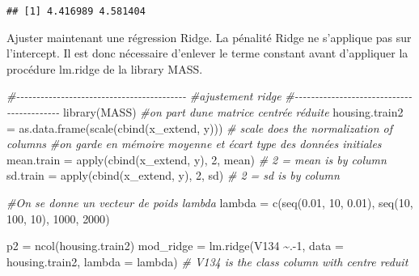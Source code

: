 \documentclass[
]{article}
\newenvironment{Shaded}{\begin{snugshade}}{\end{snugshade}}
\newcommand{\AttributeTok}[1]{\textcolor[rgb]{0.77,0.63,0.00}{#1}}
\newcommand{\CommentTok}[1]{\textcolor[rgb]{0.56,0.35,0.01}{\textit{#1}}}
\newcommand{\DecValTok}[1]{\textcolor[rgb]{0.00,0.00,0.81}{#1}}
\newcommand{\FloatTok}[1]{\textcolor[rgb]{0.00,0.00,0.81}{#1}}
\newcommand{\FunctionTok}[1]{\textcolor[rgb]{0.00,0.00,0.00}{#1}}
\newcommand{\NormalTok}[1]{#1}
\newcommand{\OtherTok}[1]{\textcolor[rgb]{0.56,0.35,0.01}{#1}}
\newcommand{\SpecialCharTok}[1]{\textcolor[rgb]{0.00,0.00,0.00}{#1}}
\begin{document}
\begin{verbatim}
## [1] 4.416989 4.581404
\end{verbatim}

Ajuster maintenant une régression Ridge. La pénalité Ridge ne s'applique
pas sur l'intercept. Il est donc nécessaire d'enlever le terme constant
avant d'appliquer la procédure lm.ridge de la library MASS.

\begin{Shaded}
\begin{Highlighting}[]
\CommentTok{\#{-}{-}{-}{-}{-}{-}{-}{-}{-}{-}{-}{-}{-}{-}{-}{-}{-}{-}{-}{-}{-}{-}{-}{-}{-}{-}{-}{-}{-}{-}{-}{-}{-}{-}{-}{-}{-}{-}{-}{-}{-}{-}}
\CommentTok{\#ajustement ridge }
\CommentTok{\#{-}{-}{-}{-}{-}{-}{-}{-}{-}{-}{-}{-}{-}{-}{-}{-}{-}{-}{-}{-}{-}{-}{-}{-}{-}{-}{-}{-}{-}{-}{-}{-}{-}{-}{-}{-}{-}{-}{-}{-}{-}{-}}
\FunctionTok{library}\NormalTok{(MASS)}
\CommentTok{\#on part d\textquotesingle{}une matrice centrée réduite}
\NormalTok{housing.train2 }\OtherTok{=} \FunctionTok{as.data.frame}\NormalTok{(}\FunctionTok{scale}\NormalTok{(}\FunctionTok{cbind}\NormalTok{(x\_extend, y))) }\CommentTok{\# scale does the normalization of columns}
\CommentTok{\#on garde en mémoire moyenne et écart type des données initiales}
\NormalTok{mean.train }\OtherTok{=} \FunctionTok{apply}\NormalTok{(}\FunctionTok{cbind}\NormalTok{(x\_extend, y), }\DecValTok{2}\NormalTok{, mean)  }\CommentTok{\# 2 = mean is by column}
\NormalTok{sd.train }\OtherTok{=} \FunctionTok{apply}\NormalTok{(}\FunctionTok{cbind}\NormalTok{(x\_extend, y), }\DecValTok{2}\NormalTok{, sd)  }\CommentTok{\# 2 = sd is by column}

\CommentTok{\#On se donne un vecteur de poids lambda}
\NormalTok{lambda }\OtherTok{=} \FunctionTok{c}\NormalTok{(}\FunctionTok{seq}\NormalTok{(}\FloatTok{0.01}\NormalTok{, }\DecValTok{10}\NormalTok{, }\FloatTok{0.01}\NormalTok{), }\FunctionTok{seq}\NormalTok{(}\DecValTok{10}\NormalTok{, }\DecValTok{100}\NormalTok{, }\DecValTok{10}\NormalTok{), }\DecValTok{1000}\NormalTok{, }\DecValTok{2000}\NormalTok{)}

\NormalTok{p2 }\OtherTok{=} \FunctionTok{ncol}\NormalTok{(housing.train2)}
\NormalTok{mod\_ridge }\OtherTok{=} \FunctionTok{lm.ridge}\NormalTok{(V134 }\SpecialCharTok{\textasciitilde{}}\NormalTok{.}\SpecialCharTok{{-}}\DecValTok{1}\NormalTok{, }\AttributeTok{data =}\NormalTok{ housing.train2, }\AttributeTok{lambda =}\NormalTok{ lambda) }
\CommentTok{\# V134 is the class column with centre reduit}
\end{Highlighting}
\end{Shaded}
\end{document}

